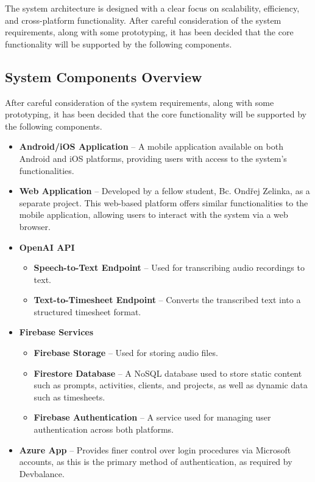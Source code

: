 \documentclass[
  digital,     %
  oneside,     %
  nosansbold,  %
  nocolorbold, %
  lof,         %
  lot,         %
]{fithesis4}
\begin{document}
The system architecture is designed with a clear focus on scalability, efficiency, and cross-platform functionality. After careful consideration of the system requirements, along with some prototyping, it has been decided that the core functionality will be supported by the following components.

\subsection{System Components Overview}

After careful consideration of the system requirements, along with some prototyping, it has been decided that the core functionality will be supported by the following components.

\begin{itemize}
    \item \textbf{Android/\gls{iOS} Application} – A mobile application available on both Android and \gls{iOS} platforms, providing users with access to the system's functionalities.
    \item \textbf{Web Application} – Developed by a fellow student, Bc. Ondřej Zelinka, as a separate project. This web-based platform offers similar functionalities to the mobile application, allowing users to interact with the system via a web browser.
    \item \textbf{OpenAI \gls{API}}
    \begin{itemize}
        \item \textbf{Speech-to-Text Endpoint} – Used for transcribing audio recordings to text.
        \item \textbf{Text-to-Timesheet Endpoint} – Converts the transcribed text into a structured timesheet format.
    \end{itemize}
    \item \textbf{Firebase Services}
    \begin{itemize}
        \item \textbf{Firebase Storage} – Used for storing audio files.
        \item \textbf{Firestore Database} – A \gls{NoSQL} database used to store static content such as prompts, activities, clients, and projects, as well as dynamic data such as timesheets.
        \item \textbf{Firebase Authentication} – A service used for managing user authentication across both platforms.
    \end{itemize}
    \item \textbf{Azure App} – Provides finer control over login procedures via Microsoft accounts, as this is the primary method of authentication, as required by Devbalance.
\end{itemize}
\end{document}
